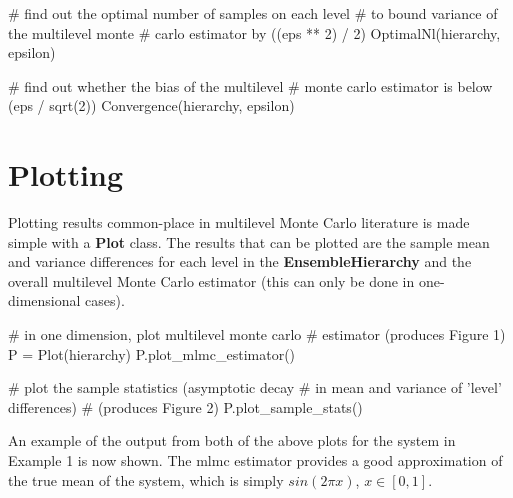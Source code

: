 \documentclass[10pt,letterpaper,extrafontsizes]{memoir}
\newcommand\pythonclass[1]{\textbf{\color{deepred}#1}}
\begin{document}
\begin{python}
# find out the optimal number of samples on each level
# to bound variance of the multilevel monte
# carlo estimator by ((eps ** 2) / 2)
OptimalNl(hierarchy, epsilon)

# find out whether the bias of the multilevel
# monte carlo estimator is below (eps / sqrt(2))
Convergence(hierarchy, epsilon)
\end{python}

\chapter{Plotting}

Plotting results common-place in multilevel Monte Carlo literature is made simple with a \pythonclass{Plot} class. The results that can be plotted are the sample mean and variance differences for each level in the \pythonclass{EnsembleHierarchy} and the overall multilevel Monte Carlo estimator (this can only be done in one-dimensional cases). \\

\begin{python}
# in one dimension, plot multilevel monte carlo
# estimator (produces Figure 1)
P = Plot(hierarchy)
P.plot_mlmc_estimator()
\end{python}

\begin{python}
# plot the sample statistics (asymptotic decay
# in mean and variance of 'level' differences)
# (produces Figure 2)
P.plot_sample_stats()
\end{python}

An example of the output from both of the above plots for the system in Example 1 is now shown. The mlmc estimator provides a good approximation of the true mean of the system, which is simply $sin(2\pi x)$, $x \in [0, 1]$. 
\end{document}
